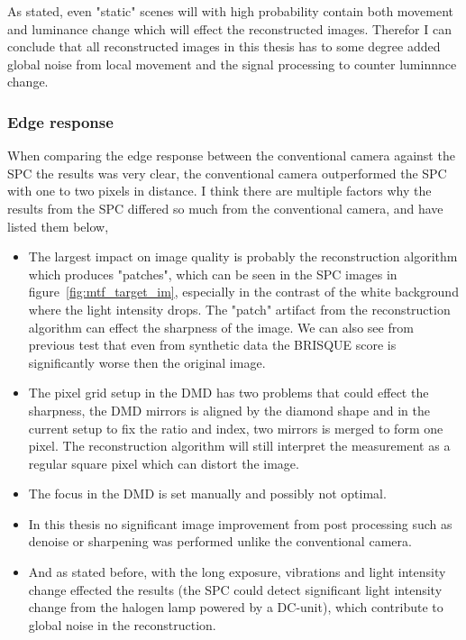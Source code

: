 As stated, even "static" scenes will with high probability contain both movement and luminance change which will effect the reconstructed images. Therefor I can conclude that all reconstructed images in this thesis has to some degree added global noise from local movement and the signal processing to counter luminnnce change.


\subsubsection{Edge response}
When comparing the edge response between the conventional camera against the SPC the results was very clear, the conventional camera outperformed the SPC with one to two pixels in distance. I think there are multiple factors why the results from the SPC differed so much from the conventional camera, and have listed them below,

\begin{itemize}
\item The largest impact on image quality is probably the reconstruction algorithm which produces "patches", which can be seen in the SPC images in figure~\ref{fig:mtf_target_im}, especially in the contrast of the white background where the light intensity drops. The "patch" artifact from the reconstruction algorithm can effect the sharpness of the image. We can also see from previous test that even from synthetic data the BRISQUE score is significantly worse then the original image.

\item The pixel grid setup in the DMD has two problems that could effect the sharpness, the DMD mirrors is aligned by the diamond shape and in the current setup to fix the ratio and index, two mirrors is merged to form one pixel. The reconstruction algorithm will still interpret the measurement as a regular square pixel which can distort the image.

\item The focus in the DMD is set manually and possibly not optimal.

\item In this thesis no significant image improvement from post processing such as denoise or sharpening was performed unlike the conventional camera.

\item And as stated before, with the long exposure, vibrations and light intensity change effected the results (the SPC could detect significant light intensity change from the halogen lamp powered by a DC-unit), which contribute to global noise in the reconstruction.

\end{itemize}

